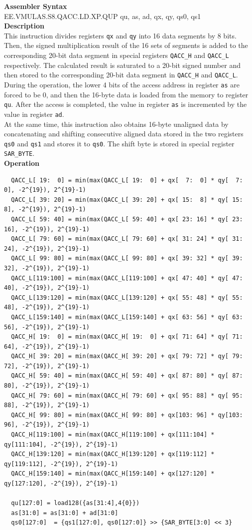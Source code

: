 \textbf{Assembler Syntax} \\
EE.VMULAS.S8.QACC.LD.XP.QUP qu, as, ad, qx, qy, qs0, qs1 \\
\textbf{Description} \\
This instruction divides registers \lstinline{qx} and \lstinline{qy} into 16 data segments by 8 bits. Then, the signed multiplication result of the 16 sets of segments is added to the corresponding 20-bit data segment in special registers \lstinline{QACC_H} and \lstinline{QACC_L} respectively. The calculated result is saturated to a 20-bit signed number and then stored to the corresponding 20-bit data segment in \lstinline{QACC_H} and \lstinline{QACC_L}.\\
During the operation, the lower 4 bits of the access address in register \lstinline{as} are forced to be 0, and then the 16-byte data is loaded from the memory to register \lstinline{qu}. After the access is completed, the value in register \lstinline{as} is incremented by the value in register \lstinline{ad}.\\
At the same time, this instruction also obtains 16-byte unaligned data by concatenating and shifting consecutive aligned data stored in the two registers \lstinline{qs0} and \lstinline{qs1} and stores it to \lstinline{qs0}. The shift byte is stored in special register \lstinline{SAR_BYTE}.\\
\textbf{Operation}
\begin{lstlisting}
  QACC_L[ 19:  0] = min(max(QACC_L[ 19:  0] + qx[  7:  0] * qy[  7:  0], -2^{19}), 2^{19}-1)
  QACC_L[ 39: 20] = min(max(QACC_L[ 39: 20] + qx[ 15:  8] * qy[ 15:  8], -2^{19}), 2^{19}-1)
  QACC_L[ 59: 40] = min(max(QACC_L[ 59: 40] + qx[ 23: 16] * qy[ 23: 16], -2^{19}), 2^{19}-1)
  QACC_L[ 79: 60] = min(max(QACC_L[ 79: 60] + qx[ 31: 24] * qy[ 31: 24], -2^{19}), 2^{19}-1)
  QACC_L[ 99: 80] = min(max(QACC_L[ 99: 80] + qx[ 39: 32] * qy[ 39: 32], -2^{19}), 2^{19}-1)
  QACC_L[119:100] = min(max(QACC_L[119:100] + qx[ 47: 40] * qy[ 47: 40], -2^{19}), 2^{19}-1)
  QACC_L[139:120] = min(max(QACC_L[139:120] + qx[ 55: 48] * qy[ 55: 48], -2^{19}), 2^{19}-1)
  QACC_L[159:140] = min(max(QACC_L[159:140] + qx[ 63: 56] * qy[ 63: 56], -2^{19}), 2^{19}-1)
  QACC_H[ 19:  0] = min(max(QACC_H[ 19:  0] + qx[ 71: 64] * qy[ 71: 64], -2^{19}), 2^{19}-1)
  QACC_H[ 39: 20] = min(max(QACC_H[ 39: 20] + qx[ 79: 72] * qy[ 79: 72], -2^{19}), 2^{19}-1)
  QACC_H[ 59: 40] = min(max(QACC_H[ 59: 40] + qx[ 87: 80] * qy[ 87: 80], -2^{19}), 2^{19}-1)
  QACC_H[ 79: 60] = min(max(QACC_H[ 79: 60] + qx[ 95: 88] * qy[ 95: 88], -2^{19}), 2^{19}-1)
  QACC_H[ 99: 80] = min(max(QACC_H[ 99: 80] + qx[103: 96] * qy[103: 96], -2^{19}), 2^{19}-1)
  QACC_H[119:100] = min(max(QACC_H[119:100] + qx[111:104] * qy[111:104], -2^{19}), 2^{19}-1)
  QACC_H[139:120] = min(max(QACC_H[139:120] + qx[119:112] * qy[119:112], -2^{19}), 2^{19}-1)
  QACC_H[159:140] = min(max(QACC_H[159:140] + qx[127:120] * qy[127:120], -2^{19}), 2^{19}-1)

  qu[127:0] = load128({as[31:4],4{0}})
  as[31:0] = as[31:0] + ad[31:0]
  qs0[127:0]  = {qs1[127:0], qs0[127:0]} >> {SAR_BYTE[3:0] << 3}
\end{lstlisting}

